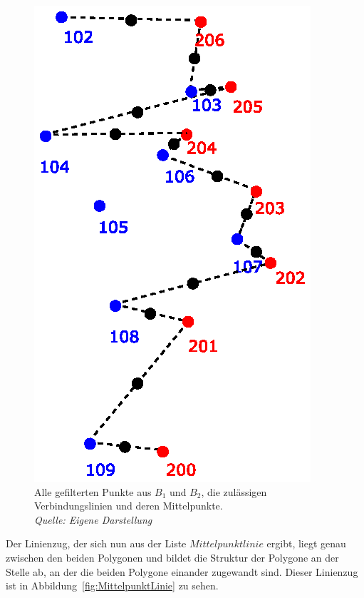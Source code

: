 \begin{figure}
	\centering
	\includegraphics[scale=0.6]{Mittelpunkte.eps}
	\caption[Verbindungslinien und deren Mittelpunkte]{Alle gefilterten Punkte aus $B_1$ und $B_2$, die zulässigen Verbindungslinien und deren Mittelpunkte.\\\textit{Quelle: Eigene Darstellung}}
	\label{fig:Mittelpunkte}
\end{figure}

Der Linienzug, der sich nun aus der Liste $Mittelpunktlinie$ ergibt, liegt genau zwischen den beiden Polygonen und bildet die Struktur der Polygone an der Stelle ab, an der die beiden Polygone einander zugewandt sind. Dieser Linienzug ist in Abbildung~\vref{fig:MittelpunktLinie} zu sehen.

